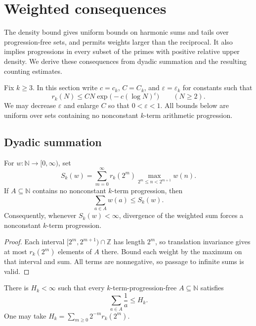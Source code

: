 \section{Weighted consequences}\label{ap:weighted}

The density bound gives uniform bounds on harmonic sums and tails over
progression-free sets, and permits weights larger than the reciprocal.
It also implies progressions in every subset of the primes with positive
relative upper density.  We derive these consequences from dyadic
summation and the resulting counting estimates.

Fix $k\ge3$. In this section write $c=c_k$, $C=C_k$, and
$\varepsilon=\varepsilon_k$ for constants such that
\begin{equation}\label{ap:weighted:density}
 r_k(N)\le CN\exp\bigl(-c(\log N)^\varepsilon\bigr)
 \qquad(N\ge2).
\end{equation}
We may decrease $\varepsilon$ and enlarge $C$ so that
$0<\varepsilon<1$. All bounds below are uniform over sets containing
no nonconstant $k$-term arithmetic progression.

\subsection{Dyadic summation}

\begin{proposition}\label{ap:weighted:dyadic}
For $w:\mathbb N\to[0,\infty)$, set
\[
 S_k(w)=\sum_{m=0}^{\infty}r_k(2^m)
                  \max_{2^m\le n<2^{m+1}}w(n).
\]
If $A\subseteq\mathbb N$ contains no nonconstant $k$-term
progression, then
\[
                       \sum_{a\in A}w(a)\le S_k(w).
\]
Consequently, whenever $S_k(w)<\infty$, divergence of the weighted
sum forces a nonconstant $k$-term progression.
\end{proposition}

\begin{proof}
Each interval $[2^m,2^{m+1})\cap\mathbb Z$ has length $2^m$,
so translation invariance gives at most $r_k(2^m)$ elements of $A$
there. Bound each weight by the maximum on that interval and sum.
All terms are nonnegative, so passage to infinite sums is valid.
\end{proof}

\begin{corollary}\label{ap:weighted:harmonic}
There is $H_k<\infty$ such that every $k$-term-progression-free
$A\subseteq\mathbb N$ satisfies
\[
              \sum_{a\in A}\frac1a\le H_k.
\]
One may take $H_k=\sum_{m\ge0}2^{-m}r_k(2^m)$.
\end{corollary}


